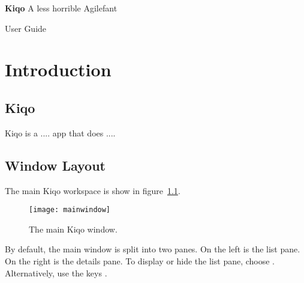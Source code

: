 \documentclass[11pt,fleqn]{book} %
\begin{document}

\begingroup
\thispagestyle{empty}
\centering
\vspace*{5cm}
\par\normalfont\fontsize{35}{35}\sffamily\selectfont
\textbf{Kiqo}
{\LARGE A less horrible Agilefant}\par %
\vspace*{1cm}
{\Huge User Guide}\par %
\endgroup


\tableofcontents %


\chapter{Introduction}
\section{Kiqo}
Kiqo is a .... app that does ....

\section{Window Layout}
The main Kiqo workspace is show in figure~\ref{fig:mainwindow}.

\begin{figure}[h]
  \centering
  \texttt{[image: mainwindow]}
  \caption{The main Kiqo window.\label{fig:mainwindow}}
\end{figure}

\pagebreak
By default, the main window is split into two panes.
On the left is the list pane.
On the right is the details pane.
To display or hide the list pane, choose .
Alternatively, use the keys .
\end{document}
